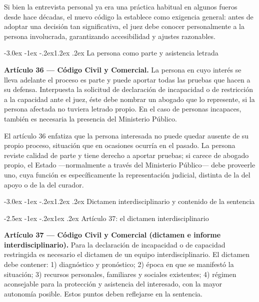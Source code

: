 \documentclass[12pt,oneside]{book}
\makeatletter
\renewcommand\section{\@startsection{section}{1}{\z@}%
  {-3.0ex \@plus -1ex \@minus -.2ex}{1.2ex \@plus .2ex}%
  {\normalfont\large\bfseries\color{acento}}}
\renewcommand\subsection{\@startsection{subsection}{2}{\z@}%
  {-2.5ex \@plus -1ex \@minus -.2ex}{1ex \@plus .2ex}%
  {\normalfont\normalsize\bfseries}}
\makeatother
\begin{document}
Si bien la entrevista personal ya era una práctica habitual en algunos fueros desde hace décadas, el nuevo código la establece como exigencia general: antes de adoptar una decisión tan significativa, el juez debe conocer personalmente a la persona involucrada, garantizando accesibilidad y ajustes razonables.

\section{La persona como parte y asistencia letrada}

\begin{importante}
\textbf{Artículo 36 --- Código Civil y Comercial.} La persona en cuyo interés se lleva adelante el proceso es parte y puede aportar todas las pruebas que hacen a su defensa. Interpuesta la solicitud de declaración de incapacidad o de restricción a la capacidad ante el juez, éste debe nombrar un abogado que lo represente, si la persona afectada no tuviera letrado propio. En el caso de personas incapaces, también es necesaria la presencia del Ministerio Público.
\end{importante}

El artículo 36 enfatiza que la persona interesada no puede quedar ausente de su propio proceso, situación que en ocasiones ocurría en el pasado. La persona reviste calidad de parte y tiene derecho a aportar pruebas; si carece de abogado propio, el Estado ---normalmente a través del Ministerio Público--- debe proveerle uno, cuya función es específicamente la representación judicial, distinta de la del apoyo o de la del curador.

\section{Dictamen interdisciplinario y contenido de la sentencia}

\subsection{Artículo 37: el dictamen interdisciplinario}

\begin{importante}
\textbf{Artículo 37 --- Código Civil y Comercial (dictamen e informe interdisciplinario).} Para la declaración de incapacidad o de capacidad restringida es necesario el dictamen de un equipo interdisciplinario. El dictamen debe contener: 1) diagnóstico y pronóstico; 2) época en que se manifestó la situación; 3) recursos personales, familiares y sociales existentes; 4) régimen aconsejable para la protección y asistencia del interesado, con la mayor autonomía posible. Estos puntos deben reflejarse en la sentencia.
\end{importante}
\end{document}
